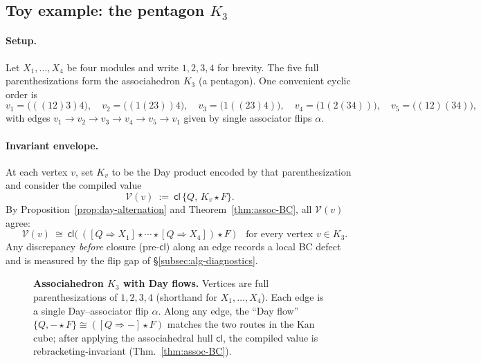 \documentclass[11pt]{article}
\numberwithin{equation}{section}
\theoremstyle{upright}
\newcommand{\R}{\mathbb{R}}
\begin{document}
\subsection{Toy example: the pentagon $K_3$}
\label{subsec:toy}

\paragraph{Setup.}
Let $X_1,\dots,X_4$ be four modules and write $1,2,3,4$ for brevity. The five full parenthesizations form the associahedron $K_3$ (a pentagon). One convenient cyclic order is
\[
v_1=\bigl(((12)3)4\bigr),\quad
v_2=\bigl((1(23))4\bigr),\quad
v_3=\bigl(1((23)4)\bigr),\quad
v_4=\bigl(1(2(34))\bigr),\quad
v_5=\bigl((12)(34)\bigr),
\]
with edges $v_1\!\to\!v_2\!\to\!v_3\!\to\!v_4\!\to\!v_5\!\to\!v_1$ given by single associator flips $\alpha$.

\paragraph{Invariant envelope.}
At each vertex $v$, set $K_v$ to be the Day product encoded by that parenthesization and consider the compiled value
\[
\mathcal V(v)\ :=\ \mathsf{cl}\,\{Q,\,K_v\star F\}.
\]
By Proposition~\ref{prop:day-alternation} and Theorem~\ref{thm:assoc-BC}, all $\mathcal V(v)$ agree:
\[
\boxed{\quad
\mathcal V(v)\ \cong\ \mathsf{cl}\Big(\ ([Q\Rightarrow X_1]\star\cdots\star[Q\Rightarrow X_4])\star F\ \Big)
\quad\text{for every vertex }v\in K_3.}
\]
Any discrepancy \emph{before} closure (pre-$\mathsf{cl}$) along an edge records a local BC defect and is measured by the flip gap of \S\ref{subsec:alg-diagnostics}.
\FloatBarrier   %
\begin{figure}[H]
\centering
{}
\caption{\textbf{Associahedron $K_3$ with Day flows.} Vertices are full parenthesizations of $1,2,3,4$ (shorthand for $X_1,\dots,X_4$). Each edge is a single Day–associator flip $\alpha$. Along any edge, the “Day flow” $\{Q,-\!\star F\}\cong([Q\Rightarrow -]\!\star F)$ matches the two routes in the Kan cube; after applying the associahedral hull $\mathsf{cl}$, the compiled value is rebracketing-invariant (Thm.~\ref{thm:assoc-BC}).}
\label{fig:K3-pentagon}
\end{figure}
\end{document}
